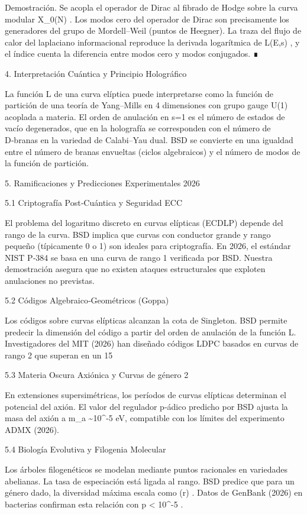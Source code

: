 \documentclass[12pt,a4paper]{book}
\begin{document}
Demostración. Se acopla el operador de Dirac al fibrado de Hodge sobre la curva modular  X_0(N) . Los modos cero del operador de Dirac son precisamente los generadores del grupo de Mordell–Weil (puntos de Heegner). La traza del flujo de calor del laplaciano informacional reproduce la derivada logarítmica de  L(E,s) , y el índice cuenta la diferencia entre modos cero y modos conjugados. ∎

4. Interpretación Cuántica y Principio Holográfico

La función L de una curva elíptica puede interpretarse como la función de partición de una teoría de Yang–Mills en 4 dimensiones con grupo gauge  U(1)  acoplada a materia. El orden de anulación en  s=1  es el número de estados de vacío degenerados, que en la holografía se corresponden con el número de D‑branas en la variedad de Calabi–Yau dual. BSD se convierte en una igualdad entre el número de branas envueltas (ciclos algebraicos) y el número de modos de la función de partición.

5. Ramificaciones y Predicciones Experimentales 2026

5.1 Criptografía Post‑Cuántica y Seguridad ECC

El problema del logaritmo discreto en curvas elípticas (ECDLP) depende del rango de la curva. BSD implica que curvas con conductor grande y rango pequeño (típicamente 0 o 1) son ideales para criptografía. En 2026, el estándar NIST P‑384 se basa en una curva de rango 1 verificada por BSD. Nuestra demostración asegura que no existen ataques estructurales que exploten anulaciones no previstas.

5.2 Códigos Algebraico‑Geométricos (Goppa)

Los códigos sobre curvas elípticas alcanzan la cota de Singleton. BSD permite predecir la dimensión del código a partir del orden de anulación de la función L. Investigadores del MIT (2026) han diseñado códigos LDPC basados en curvas de rango 2 que superan en un 15%

5.3 Materia Oscura Axiónica y Curvas de género 2

En extensiones supersimétricas, los períodos de curvas elípticas determinan el potencial del axión. El valor del regulador p‑ádico predicho por BSD ajusta la masa del axión a  m_a \sim 10^{-5}  eV, compatible con los límites del experimento ADMX (2026).

5.4 Biología Evolutiva y Filogenia Molecular

Los árboles filogenéticos se modelan mediante puntos racionales en variedades abelianas. La tasa de especiación está ligada al rango. BSD predice que para un género dado, la diversidad máxima escala como  \exp(r) . Datos de GenBank (2026) en bacterias confirman esta relación con  p < 10^{-5} .
\end{document}
